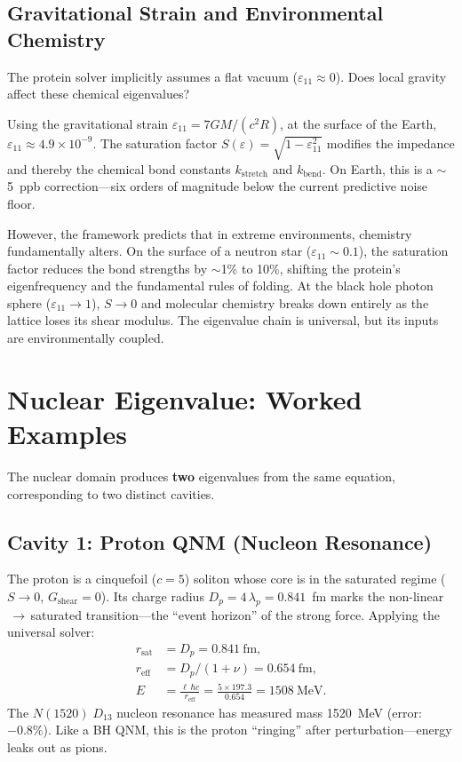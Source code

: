 \subsection{Gravitational Strain and Environmental Chemistry}

The protein solver implicitly assumes a flat vacuum ($\varepsilon_{11} \approx 0$). Does local gravity affect these chemical eigenvalues?

Using the gravitational strain $\varepsilon_{11} = 7GM/(c^2 R)$, at the surface of the Earth, $\varepsilon_{11} \approx 4.9 \times 10^{-9}$. The saturation factor $S(\varepsilon) = \sqrt{1 - \varepsilon_{11}^2}$ modifies the impedance and thereby the chemical bond constants $k_\mathrm{stretch}$ and $k_\mathrm{bend}$. On Earth, this is a $\sim$5~ppb correction---six orders of magnitude below the current predictive noise floor.

However, the framework predicts that in extreme environments, chemistry fundamentally alters. On the surface of a neutron star ($\varepsilon_{11} \sim 0.1$), the saturation factor reduces the bond strengths by $\sim$1\% to 10\%, shifting the protein's eigenfrequency and the fundamental rules of folding. At the black hole photon sphere ($\varepsilon_{11} \to 1$), $S \to 0$ and molecular chemistry breaks down entirely as the lattice loses its shear modulus. The eigenvalue chain is universal, but its inputs are environmentally coupled.

\section{Nuclear Eigenvalue: Worked Examples}
\label{sec:nuclear_eigenvalue}

The nuclear domain produces \textbf{two} eigenvalues from the same equation, corresponding to two distinct cavities.

\subsection{Cavity 1: Proton QNM (Nucleon Resonance)}

The proton is a cinquefoil ($c = 5$) soliton whose core is in the saturated regime ($S \to 0$, $G_\mathrm{shear} = 0$).  Its charge radius $D_p = 4\,\lambda_p = 0.841$~fm marks the non-linear$\,\to\,$saturated transition---the ``event horizon'' of the strong force.  Applying the universal solver:
\begin{align}
    r_\mathrm{sat} &= D_p = 0.841~\mathrm{fm}, \\
    r_\mathrm{eff} &= D_p / (1 + \nu) = 0.654~\mathrm{fm}, \\
    E &= \frac{\ell\,\hbar c}{r_\mathrm{eff}} = \frac{5 \times 197.3}{0.654} = 1508~\mathrm{MeV}.
\end{align}
The $N(1520)\;D_{13}$ nucleon resonance has measured mass 1520~MeV (error: $-0.8\%$).  Like a BH QNM, this is the proton ``ringing'' after perturbation---energy leaks out as pions.

